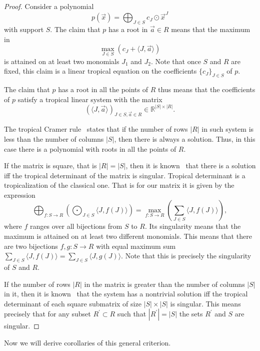 \documentclass[11pt]{article}
\newcommand{\tp}{\odot}
\newcommand{\bb}[1]{\mathbb{#1}}
\begin{document}
\begin{proof}
Consider a polynomial 
$$
p(\vec{x}) = \bigoplus_{J \in S} c_J \tp \vec{x}^{J}
$$
with support $S$.
The claim that $p$ has a root in $\vec{a} \in R$ means that the maximum in 
$$
\max_{J\in S} \left(c_{J} + \langle J, \vec{a} \rangle\right)
$$
is attained on at least two monomials $J_1$ and $J_2$.
Note that once $S$ and $R$ are fixed, this claim is a linear tropical equation on the coefficients $\{c_J\}_{J \in S}$ of $p$.

The claim that $p$ has a root in all the points of $R$ thus means that the coefficients of $p$ satisfy a tropical linear system with the matrix 
$$
\left(\langle J, \vec{a}\rangle\right)_{J \in S, \vec{a} \in R} \in \bb{R}^{|S|\times |R|}.
$$

The tropical Cramer rule~\cite[Theorem 5.3]{RGST05first_steps} states that if the number of rows $|R|$ in such system is less than the number of columns $|S|$, then there is always a solution. Thus, in this case there is a polynomial with roots in all the points of $R$.

If the matrix is square, that is $|R|=|S|$, then it is known~\cite[Lemma 5.1]{RGST05first_steps} that there is a solution iff the tropical determinant of the matrix is singular. Tropical determinant is a tropicalization of the classical one. That is for our matrix it is given by the expression
$$
\bigoplus_{f\colon S \to R} \left( \bigodot_{J \in S}  \langle J, f(J)\rangle \right) = \max_{f\colon S \to R} \left( \sum_{J \in S}  \langle J, f(J)\rangle \right),
$$
where $f$ ranges over all bijections from $S$ to $R$.
Its singularity means that the maximum is attained on at least two different monomials. This means that there are two bijections $f,g \colon S \to R$ with equal maximum sum $\sum_{J \in S}  \langle J, f(J)\rangle = \sum_{J \in S}  \langle J, g(J)\rangle$. Note that this is precisely the singularity of $S$ and $R$.

If the number of rows $|R|$ in the matrix is greater than the number of columns $|S|$ in it, then it is known~\cite{AkianGG09rank,DSS05rank,Grigoriev13complexity,IzhakianR2009rank} that the system has a nontrivial solution iff the tropical determinant of each square submatrix of size $|S|\times |S|$ is singular. This means precisely that for any subset $R^\prime \subset R$ such that $|R^\prime| = |S|$ the sets $R^\prime$ and $S$ are singular.
\end{proof}

Now we will derive corollaries of this general criterion.
\end{document}
